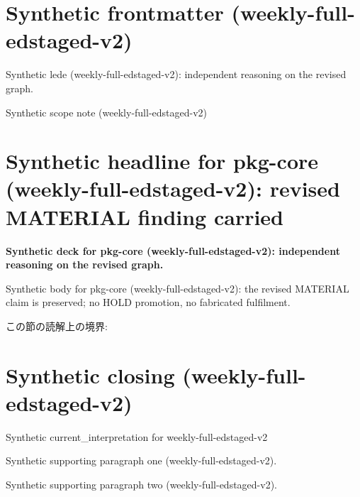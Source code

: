 \documentclass[lualatex,a4paper,10pt]{jlreq}
\begin{document}
\surveycover
\clearpage
\section*{Synthetic frontmatter (weekly-full-edstaged-v2)}
Synthetic lede (weekly-full-edstaged-v2): independent reasoning on the revised graph.

\begin{claimboundary}
\noindent Synthetic scope note (weekly-full-edstaged-v2)\par
\end{claimboundary}
\clearpage
\twocolumn
\section{Synthetic headline for pkg-core (weekly-full-edstaged-v2): revised MATERIAL finding carried}
\label{pkg:pkg-core}
\noindent\textbf{Synthetic deck for pkg-core (weekly-full-edstaged-v2): independent reasoning on the revised graph.} \cite{w2026-W33target-source}\par\medskip
\noindent Synthetic body for pkg-core (weekly-full-edstaged-v2): the revised MATERIAL claim is preserved; no HOLD promotion, no fabricated fulfilment.\par\medskip
\begin{claimboundary}
この節の読解上の境界: 
\end{claimboundary}
\clearpage
\onecolumn
\section{Synthetic closing (weekly-full-edstaged-v2)}
\label{sec:issue-summary}
\noindent Synthetic current\_interpretation for weekly-full-edstaged-v2\par\medskip
\noindent Synthetic supporting paragraph one (weekly-full-edstaged-v2).\par\medskip
\noindent Synthetic supporting paragraph two (weekly-full-edstaged-v2).\par\medskip
\clearpage
\onecolumn
\printbibliography[title={References / Source Notes}]
\end{document}
